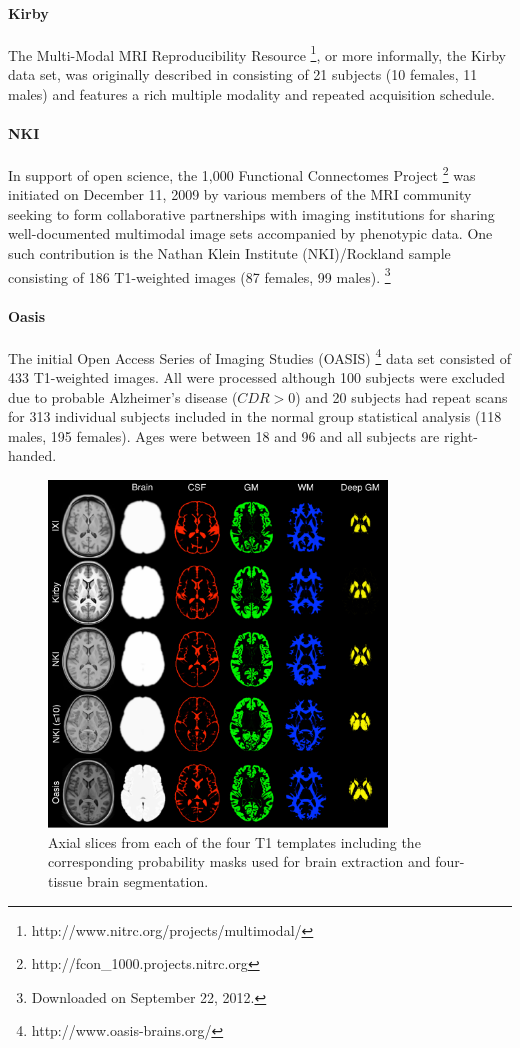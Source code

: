 \paragraph{Kirby}
The Multi-Modal MRI Reproducibility Resource%
\footnote{
http://www.nitrc.org/projects/multimodal/
}, 
or more informally, the Kirby
data set, was originally described in \cite{landman2011} consisting of 
21 subjects (10 females, 11 males) and features a rich multiple modality and 
repeated acquisition schedule.

\paragraph{NKI}
In support of open science, the 1,000 Functional Connectomes Project%
\footnote{ 
http://fcon\_1000.projects.nitrc.org
}
was initiated on December 11, 2009 by various members of the MRI community
seeking to form collaborative partnerships with imaging institutions for 
sharing well-documented multimodal image sets accompanied by phenotypic data.
One such contribution is the Nathan Klein Institute (NKI)/Rockland sample
consisting of 186 T1-weighted
images (87 females, 99 males).%
\footnote{
Downloaded on September 22, 2012.
}

\paragraph{Oasis}
The initial Open Access Series of Imaging Studies (OASIS)%
\footnote{
http://www.oasis-brains.org/
}
data set consisted of 433 T1-weighted images.  All were processed
although 100 subjects were excluded due to probable Alzheimer's
disease ($CDR > 0$) and 20 subjects had repeat scans
for 313 individual subjects included in the normal group statistical
analysis (118 males, 195 females).
Ages were between 18 and 96 and  
all subjects are right-handed.  


\begin{figure}
  \centering
  \includegraphics[width=90mm]{Figures/templateProbabilityMasks.pdf}
  \caption{Axial slices from each of the four T1 templates including the corresponding
  probability masks used for brain extraction and four-tissue brain segmentation.  
  }
  \label{fig:templateMasks}
\end{figure}



